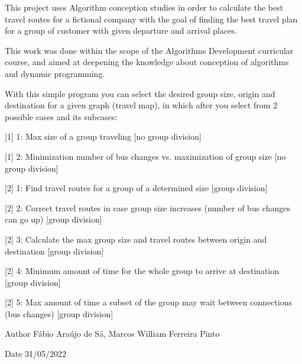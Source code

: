 This project uses Algorithm conception studies in order to calculate the best travel routes for a fictional company with the goal of finding the best travel plan for a group of customer with given departure and arrival places.

This work was done within the scope of the Algorithms Development curricular course, and aimed at deepening the knowledge about conception of algorithms and dynamic programming.

With this simple program you can select the desired group size, origin and destination for a given graph (travel map), in which after you select from 2 possible cases and its subcases\+:
\begin{DoxyItemize}
\item \mbox{[}1\mbox{]} 1\+: Max size of a group traveling \mbox{[}no group division\mbox{]}
\item \mbox{[}1\mbox{]} 2\+: Minimization number of bus changes vs. maximization of group size \mbox{[}no group division\mbox{]}
\item \mbox{[}2\mbox{]} 1\+: Find travel routes for a group of a determined size \mbox{[}group division\mbox{]}
\item \mbox{[}2\mbox{]} 2\+: Correct travel routes in case group size increases (number of bus changes can go up) \mbox{[}group division\mbox{]}
\item \mbox{[}2\mbox{]} 3\+: Calculate the max group size and travel routes between origin and destination \mbox{[}group division\mbox{]}
\item \mbox{[}2\mbox{]} 4\+: Minimum amount of time for the whole group to arrive at destination \mbox{[}group division\mbox{]}
\item \mbox{[}2\mbox{]} 5\+: Max amount of time a subset of the group may wait between connections (bus changes) \mbox{[}group division\mbox{]}
\end{DoxyItemize}

\begin{DoxyAuthor}{Author}
Fábio Araújo de Sá, Marcos William Ferreira Pinto
\end{DoxyAuthor}
\begin{DoxyDate}{Date}
31/05/2022 
\end{DoxyDate}
